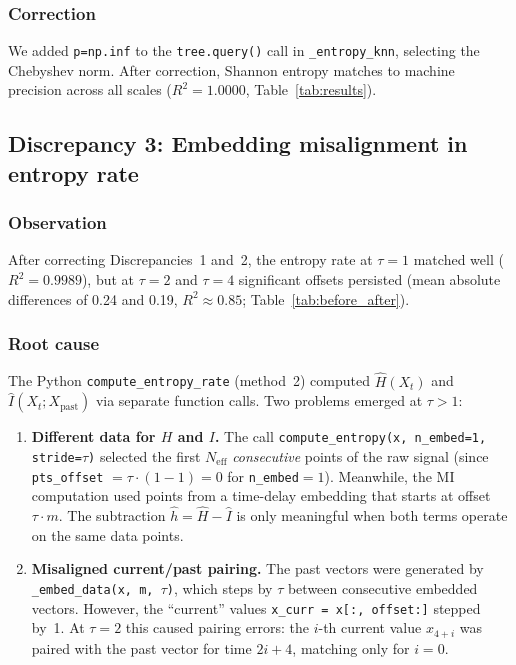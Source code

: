 \documentclass[12pt,a4paper]{article}
\newcommand{\Neff}{N_{\mathrm{eff}}}
\begin{document}
\subsubsection{Correction}
We added \texttt{p=np.inf} to the \texttt{tree.query()} call in \texttt{\_entropy\_knn}, selecting the Chebyshev norm.
After correction, Shannon entropy matches to machine precision across all scales ($R^2 = 1.0000$, Table~\ref{tab:results}).


\subsection{Discrepancy 3: Embedding misalignment in entropy rate}\label{sec:bug3}

\subsubsection{Observation}
After correcting Discrepancies~1 and~2, the entropy rate at $\tau = 1$ matched well ($R^2 = 0.9989$), but at $\tau = 2$ and $\tau = 4$ significant offsets persisted (mean absolute differences of 0.24 and 0.19, $R^2 \approx 0.85$; Table~\ref{tab:before_after}).

\subsubsection{Root cause}
The Python \texttt{compute\_entropy\_rate} (method~2) computed $\hat{H}(X_t)$ and $\hat{I}(X_t; X_{\mathrm{past}})$ via separate function calls.
Two problems emerged at $\tau > 1$:

\begin{enumerate}
  \item \textbf{Different data for $H$ and $I$.}
  The call \texttt{compute\_entropy(x, n\_embed=1, stride=$\tau$)} selected the first $\Neff$ \emph{consecutive} points of the raw signal (since \texttt{pts\_offset} $= \tau \cdot (1-1) = 0$ for \texttt{n\_embed}${}=1$).
  Meanwhile, the MI computation used points from a time-delay embedding that starts at offset $\tau \cdot m$.
  The subtraction $\hat{h} = \hat{H} - \hat{I}$ is only meaningful when both terms operate on the same data points.

  \item \textbf{Misaligned current/past pairing.}
  The past vectors were generated by \texttt{\_embed\_data(x, m, $\tau$)}, which steps by $\tau$ between consecutive embedded vectors.
  However, the ``current'' values \texttt{x\_curr = x[:, offset:]} stepped by~1.
  At $\tau = 2$ this caused pairing errors: the $i$-th current value $x_{4+i}$ was paired with the past vector for time $2i + 4$, matching only for $i = 0$.
\end{enumerate}
\end{document}

